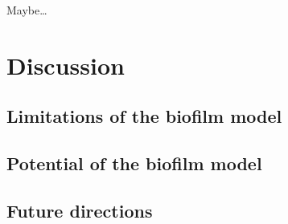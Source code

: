 \documentclass[
]{book}
\begin{document}
Maybe\ldots{}

\hypertarget{discussion}{%
\chapter{Discussion}\label{discussion}}

\hypertarget{limitations-of-the-biofilm-model}{%
\section{Limitations of the biofilm model}\label{limitations-of-the-biofilm-model}}

\hypertarget{potential-of-the-biofilm-model}{%
\section{Potential of the biofilm model}\label{potential-of-the-biofilm-model}}

\hypertarget{future-directions}{%
\section{Future directions}\label{future-directions}}

\printbibliography
\end{document}
